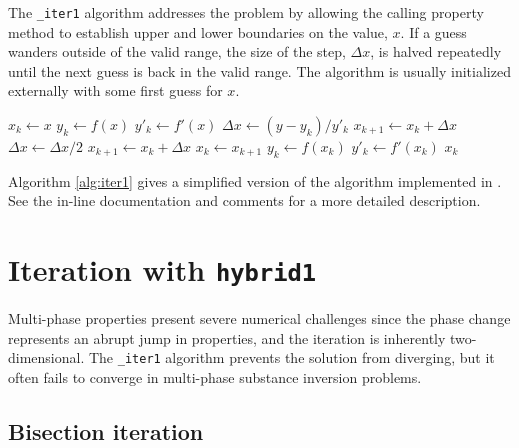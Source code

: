 The \verb|_iter1| algorithm addresses the problem by allowing the calling property method to establish upper and lower boundaries on the value, $x$.  If a guess wanders outside of the valid range, the size of the step, $\Delta x$, is halved repeatedly until the next guess is back in the valid range.  The algorithm is usually initialized externally with some first guess for $x$.

\begin{algorithm}
\caption{ITER1: Modified bounded Newton-Rhapson iteration, $y = f(x)$}\label{alg:iter1}
\begin{algorithmic}
\State $x_k \gets x$ 
\State $y_k \gets f(x)$ 
\State $y'_k \gets f'(x)$
 
\State $\Delta x \gets (y - y_k)/y'_k$ 
\State $x_{k+1} \gets x_k + \Delta x$ 
\State {}
\State $\Delta x \gets \Delta x / 2$ 
\State $x_{k+1} \gets x_k + \Delta x$ 
\EndWhile
\State $x_{k} \gets x_{k+1}$ 
\State $y_k \gets f(x_k)$ 
\State $y'_k \gets f'(x_k)$
\EndWhile
\State \Return $x_k$
\EndProcedure
\end{algorithmic}
\end{algorithm}

Algorithm \ref{alg:iter1} gives a simplified version of the algorithm implemented in \PM.  See the in-line documentation and comments for a more detailed description.

\section{Iteration with \texttt{hybrid1}}\label{sec:num:hybrid1}

Multi-phase properties present severe numerical challenges since the phase change represents an abrupt jump in properties, and the iteration is inherently two-dimensional.  The \verb|_iter1| algorithm prevents the solution from diverging, but it often fails to converge in multi-phase substance inversion problems.

\subsection{Bisection iteration}\label{sec:num:bisection}


